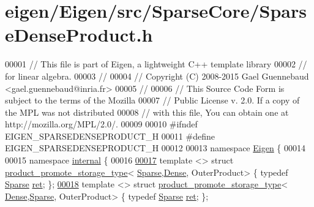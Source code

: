 \hypertarget{eigen_2_eigen_2src_2_sparse_core_2_sparse_dense_product_8h_source}{}\section{eigen/\+Eigen/src/\+Sparse\+Core/\+Sparse\+Dense\+Product.h}
\label{eigen_2_eigen_2src_2_sparse_core_2_sparse_dense_product_8h_source}

\begin{DoxyCode}
00001 \textcolor{comment}{// This file is part of Eigen, a lightweight C++ template library}
00002 \textcolor{comment}{// for linear algebra.}
00003 \textcolor{comment}{//}
00004 \textcolor{comment}{// Copyright (C) 2008-2015 Gael Guennebaud <gael.guennebaud@inria.fr>}
00005 \textcolor{comment}{//}
00006 \textcolor{comment}{// This Source Code Form is subject to the terms of the Mozilla}
00007 \textcolor{comment}{// Public License v. 2.0. If a copy of the MPL was not distributed}
00008 \textcolor{comment}{// with this file, You can obtain one at http://mozilla.org/MPL/2.0/.}
00009 
00010 \textcolor{preprocessor}{#ifndef EIGEN\_SPARSEDENSEPRODUCT\_H}
00011 \textcolor{preprocessor}{#define EIGEN\_SPARSEDENSEPRODUCT\_H}
00012 
00013 \textcolor{keyword}{namespace }\hyperlink{namespace_eigen}{Eigen} \{ 
00014 
00015 \textcolor{keyword}{namespace }\hyperlink{namespaceinternal}{internal} \{
00016 
\hyperlink{struct_eigen_1_1internal_1_1product__promote__storage__type_3_01_sparse_00_01_dense_00_01_outer_product_01_4}{00017} \textcolor{keyword}{template} <> \textcolor{keyword}{struct }\hyperlink{struct_eigen_1_1internal_1_1product__promote__storage__type}{product\_promote\_storage\_type}<
      \hyperlink{struct_eigen_1_1_sparse}{Sparse},\hyperlink{struct_eigen_1_1_dense}{Dense}, OuterProduct> \{ \textcolor{keyword}{typedef} \hyperlink{struct_eigen_1_1_sparse}{Sparse} \hyperlink{struct_eigen_1_1_sparse}{ret}; \};
\hyperlink{struct_eigen_1_1internal_1_1product__promote__storage__type_3_01_dense_00_01_sparse_00_01_outer_product_01_4}{00018} \textcolor{keyword}{template} <> \textcolor{keyword}{struct }\hyperlink{struct_eigen_1_1internal_1_1product__promote__storage__type}{product\_promote\_storage\_type}<
      \hyperlink{struct_eigen_1_1_dense}{Dense},\hyperlink{struct_eigen_1_1_sparse}{Sparse}, OuterProduct> \{ \textcolor{keyword}{typedef} \hyperlink{struct_eigen_1_1_sparse}{Sparse} \hyperlink{struct_eigen_1_1_sparse}{ret}; \};

\end{DoxyCode}
